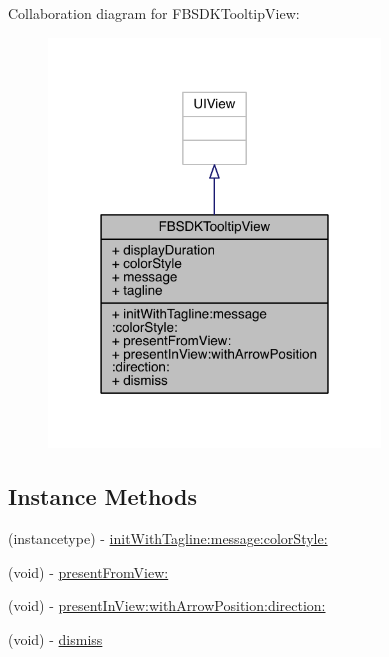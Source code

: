 Collaboration diagram for F\-B\-S\-D\-K\-Tooltip\-View\-:
\nopagebreak
\begin{figure}[H]
\begin{center}
\leavevmode
\includegraphics[width=250pt]{interface_f_b_s_d_k_tooltip_view__coll__graph}
\end{center}
\end{figure}
\subsection*{Instance Methods}
\begin{DoxyCompactItemize}
\item 
(instancetype) -\/ \hyperlink{interface_f_b_s_d_k_tooltip_view_a43e09351fea51aba22ac6cf935d8e392}{init\-With\-Tagline\-:message\-:color\-Style\-:}
\item 
(void) -\/ \hyperlink{interface_f_b_s_d_k_tooltip_view_a32f5e16fb896d187676e116b9a5f4bc5}{present\-From\-View\-:}
\item 
(void) -\/ \hyperlink{interface_f_b_s_d_k_tooltip_view_ad815d7277fed56b3092ac704dd5c644c}{present\-In\-View\-:with\-Arrow\-Position\-:direction\-:}
\item 
(void) -\/ \hyperlink{interface_f_b_s_d_k_tooltip_view_ad4d16e66754fef6dcb08a3f1d29ebca6}{dismiss}
\end{DoxyCompactItemize}
